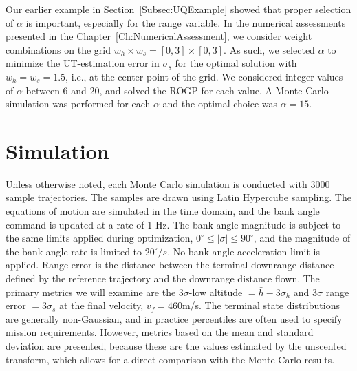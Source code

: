 Our earlier example in Section~\ref{Subsec:UQExample} showed that proper selection of $\alpha$ is important, especially for the range variable. In the numerical assessments presented in the Chapter~\ref{Ch:NumericalAssessment}, we consider weight combinations on the grid $w_h\times w_s = [0,3]\times[0,3]$. As such, we selected $\alpha$ to minimize the UT-estimation error in $\sigma_s$ for the optimal solution with $w_h=w_s=1.5$, i.e., at the center point of the grid. We considered integer values of $\alpha$ between 6 and 20, and solved the ROGP for each value. A Monte Carlo simulation was performed for each $\alpha$ and the optimal choice was $\alpha=15$. 

\section{Simulation}
Unless otherwise noted, each Monte Carlo simulation is conducted with 3000 sample trajectories. The samples are drawn using Latin Hypercube sampling. The equations of motion are simulated in the time domain, and the bank angle command is updated at a rate of 1 Hz. The bank angle magnitude is subject to the same limits applied during optimization, $0^{\circ}\le|\sigma|\le90^{\circ}$, and the magnitude of the bank angle rate is limited to $20^{\circ}/s$. No bank angle acceleration limit is applied. Range error is the distance between the terminal downrange distance defined by the reference trajectory and the downrange distance flown. The primary metrics we will examine are the 3$\sigma$-low altitude $=\bar{h}-3\sigma_h$ and 3$\sigma$ range error $= 3\sigma_s$ at the final velocity, $v_f=460$m/s. The terminal state distributions are generally non-Gaussian, and in practice percentiles are often used to specify mission requirements. However, metrics based on the mean and standard deviation are presented, because these are the values estimated by the unscented transform, which allows for a direct comparison with the Monte Carlo results.


